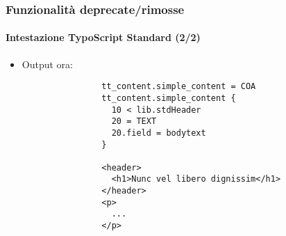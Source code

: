 
\begin{frame}[fragile]
	\frametitle{Funzionalità deprecate/rimosse}
	\framesubtitle{Intestazione TypoScript Standard (2/2)}

	\lstset{basicstyle=\tiny\ttfamily}

	\begin{itemize}

		\item Output ora:

			\begin{lstlisting}
				tt_content.simple_content = COA
				tt_content.simple_content {
				  10 < lib.stdHeader
				  20 = TEXT
				  20.field = bodytext
				}

				<header>
				  <h1>Nunc vel libero dignissim</h1>
				</header>
				<p>
				  ...
				</p>
			\end{lstlisting}

	\end{itemize}

\end{frame}


